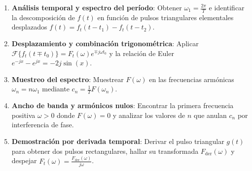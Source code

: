 \begin{mecanizado}
\begin{enumerate}
    \item \textbf{Análisis temporal y espectro del período}: Obtener $\omega_1 = \frac{2\pi}{T}$ e identificar la descomposición de $f(t)$ en función de pulsos triangulares elementales desplazados $f(t) = f_t(t - t_1) - f_t(t - t_2)$.
    \item \textbf{Desplazamiento y combinación trigonométrica}: Aplicar $\mathcal{F}\{f_t(t \mp t_0)\} = F_t(\omega) e^{\mp j\omega t_0}$ y la relación de Euler $e^{-jx} - e^{jx} = -2j\sin(x)$.
    \item \textbf{Muestreo del espectro}: Muestrear $F(\omega)$ en las frecuencias armónicas $\omega_n = n\omega_1$ mediante $c_n = \frac{1}{T} F(\omega_n)$.
    \item \textbf{Ancho de banda y armónicos nulos}: Encontrar la primera frecuencia positiva $\omega > 0$ donde $F(\omega) = 0$ y analizar los valores de $n$ que anulan $c_n$ por interferencia de fase.
    \item \textbf{Demostración por derivada temporal}: Derivar el pulso triangular $g(t)$ para obtener dos pulsos rectangulares, hallar su transformada $F_{\text{der}}(\omega)$ y despejar $F_t(\omega) = \frac{F_{\text{der}}(\omega)}{j\omega}$.
\end{enumerate}
\end{mecanizado}

